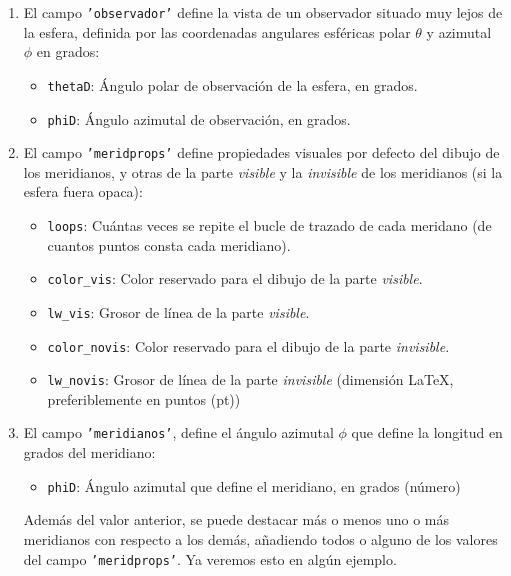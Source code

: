 \begin{enumerate}
\item El campo \texttt{'observador'} define la vista de un observador situado muy lejos
  de la esfera, definida por las coordenadas angulares esféricas polar $\theta$ y
  azimutal $\phi$ en grados:
  \begin{itemize}
    \vspace*{-1ex}
  \item \texttt{thetaD}: Ángulo polar de observación de la esfera, en grados.
  \item \texttt{phiD}: Ángulo azimutal de observación, en grados.
  \end{itemize}
\item El campo \texttt{'meridprops'} define propiedades visuales por defecto del dibujo
  de los meridianos, y otras de la parte \emph{visible} y la \emph{invisible} de los
  meridianos (si la esfera fuera opaca):
  \begin{itemize}
    \vspace*{-1ex}
  \item \texttt{loops}: Cuántas veces se repite el bucle de trazado de cada meridano
    (de cuantos puntos consta cada meridiano).
  \item \texttt{color\_vis}: Color reservado para el dibujo de la parte \emph{visible}.
  \item \texttt{lw\_vis}: Grosor de línea de la parte \emph{visible}.
  \item \texttt{color\_novis}: Color reservado para el dibujo de la parte
    \emph{invisible}.
  \item \texttt{lw\_novis}: Grosor de línea de la parte \emph{invisible} (dimensión
    \LaTeX , preferiblemente en puntos (\unit{pt}))
  \end{itemize}  
\item El campo \texttt{'meridianos'}, define el ángulo azimutal $\phi$ que define la
  longitud en grados del meridiano:
  \begin{itemize}
        \vspace*{-1ex}
        \item \texttt{phiD}: Ángulo azimutal que define el meridiano, en grados (número)
        \end{itemize}
        Además del valor anterior, se puede destacar más o menos uno o más meridianos
        con respecto a los demás, añadiendo todos o alguno de los valores del
        campo \texttt{'meridprops'}. Ya veremos esto en algún ejemplo.
\end{enumerate}

